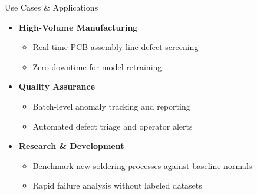 \documentclass[aspectratio=169, 11pt]{beamer}
\newcommand{\emphred}[1]{\textcolor{secondary}{#1}}
\begin{document}
\begin{frame}{\emphred{Use Cases \& Applications}}
    \begin{itemize}
        \item \textbf{High-Volume Manufacturing}
        \begin{itemize}
            \item Real-time PCB assembly line defect screening
            \item Zero downtime for model retraining
        \end{itemize}

        \item \textbf{Quality Assurance}
        \begin{itemize}
            \item Batch-level anomaly tracking and reporting
            \item Automated defect triage and operator alerts
        \end{itemize}

        \item \textbf{Research \& Development}
        \begin{itemize}
            \item Benchmark new soldering processes against baseline normals
            \item Rapid failure analysis without labeled datasets
        \end{itemize}
    \end{itemize}
\end{frame}
\end{document}
